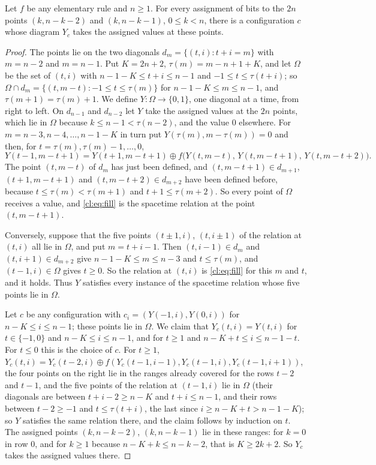 \begin{lemma}\label{cl:lem:stair}
Let $f$ be any elementary rule and $n\ge1$. For every assignment of bits to the $2n$ points $(k,n-k-2)$ and $(k,n-k-1)$, $0\le k<n$, there is a configuration $c$ whose diagram $Y_c$ takes the assigned values at these points.
\end{lemma}

\begin{proof}
The points lie on the two diagonals $d_m=\{(t,i):t+i=m\}$ with $m=n-2$ and $m=n-1$. Put $K=2n+2$, $\tau(m)=m-n+1+K$, and let $\Omega$ be the set of $(t,i)$ with $n-1-K\le t+i\le n-1$ and $-1\le t\le\tau(t+i)$; so $\Omega\cap d_m=\{(t,m-t):-1\le t\le\tau(m)\}$ for $n-1-K\le m\le n-1$, and $\tau(m+1)=\tau(m)+1$. We define $Y\colon\Omega\to\{0,1\}$, one diagonal at a time, from right to left. On $d_{n-1}$ and $d_{n-2}$ let $Y$ take the assigned values at the $2n$ points, which lie in $\Omega$ because $k\le n-1<\tau(n-2)$, and the value $0$ elsewhere. For $m=n-3,n-4,\dots,n-1-K$ in turn put $Y(\tau(m),m-\tau(m))=0$ and then, for $t=\tau(m),\tau(m)-1,\dots,0$,
\begin{equation}\label{cl:eq:fill}
Y(t-1,m-t+1)=Y(t+1,m-t+1)\oplus f\bigl(Y(t,m-t),\,Y(t,m-t+1),\,Y(t,m-t+2)\bigr).
\end{equation}
The point $(t,m-t)$ of $d_m$ has just been defined, and $(t,m-t+1)\in d_{m+1}$, $(t+1,m-t+1)$ and $(t,m-t+2)\in d_{m+2}$ have been defined before, because $t\le\tau(m)<\tau(m+1)$ and $t+1\le\tau(m+2)$. So every point of $\Omega$ receives a value, and \eqref{cl:eq:fill} is the spacetime relation at the point $(t,m-t+1)$.

Conversely, suppose that the five points $(t\pm1,i)$, $(t,i\pm1)$ of the relation at $(t,i)$ all lie in $\Omega$, and put $m=t+i-1$. Then $(t,i-1)\in d_m$ and $(t,i+1)\in d_{m+2}$ give $n-1-K\le m\le n-3$ and $t\le\tau(m)$, and $(t-1,i)\in\Omega$ gives $t\ge0$. So the relation at $(t,i)$ is \eqref{cl:eq:fill} for this $m$ and $t$, and it holds. Thus $Y$ satisfies every instance of the spacetime relation whose five points lie in $\Omega$.

Let $c$ be any configuration with $c_i=(Y(-1,i),Y(0,i))$ for $n-K\le i\le n-1$; these points lie in $\Omega$. We claim that $Y_c(t,i)=Y(t,i)$ for $t\in\{-1,0\}$ and $n-K\le i\le n-1$, and for $t\ge1$ and $n-K+t\le i\le n-1-t$. For $t\le0$ this is the choice of $c$. For $t\ge1$, $Y_c(t,i)=Y_c(t-2,i)\oplus f(Y_c(t-1,i-1),Y_c(t-1,i),Y_c(t-1,i+1))$, the four points on the right lie in the ranges already covered for the rows $t-2$ and $t-1$, and the five points of the relation at $(t-1,i)$ lie in $\Omega$ (their diagonals are between $t+i-2\ge n-K$ and $t+i\le n-1$, and their rows between $t-2\ge-1$ and $t\le\tau(t+i)$, the last since $i\ge n-K+t>n-1-K$); so $Y$ satisfies the same relation there, and the claim follows by induction on $t$. The assigned points $(k,n-k-2)$, $(k,n-k-1)$ lie in these ranges: for $k=0$ in row $0$, and for $k\ge1$ because $n-K+k\le n-k-2$, that is $K\ge2k+2$. So $Y_c$ takes the assigned values there.
\end{proof}

